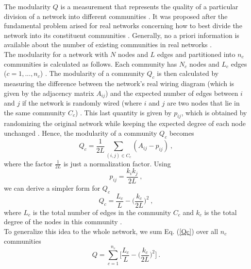\documentclass[11 pt , letterpaper , twoside , openright]{book}
\begin{document}
The modularity $Q$ is a measurement that represents the quality of a particular division of a network into different communities \cite{F.Costa2007}. It was proposed after the fundamental problem arised for real networks concerning how to best divide the network into its constituent communities \cite{F.Costa2007}. Generally, no a priori information is available about the number of existing communities in real networks \cite{F.Costa2007}.\\
\newline
The modularity for a network with $N$ nodes and $L$ edges and partitioned into $n_c$ communities is calculated as follows. Each community has $N_c$ nodes and $L_c$ edges ($c = 1,..., n_c$) \cite{Albert2016}. The modularity of a community $Q_c$ is then calculated by measuring the difference between the network's real wiring diagram (which is given by the adjacency matrix $A_{ij}$) and the expected number of edges between $i$ and $j$ if the network is randomly wired (where $i$ and $j$ are two nodes that lie in the same community $C_c$) \cite{Albert2016}. This last quantity is given by $p_{ij}$, which is obtained by randomizing the original network while keeping the expected degree of each node unchanged \cite{Albert2016}. Hence, the modularity of a community $Q_c$ becomes \cite{Albert2016}
\begin{equation}
	Q_c = \frac{1}{2L}\sum_{(i,j) \in C_c} (A_{ij} - p_{ij}) \ ,
\end{equation}
where the factor $\frac{1}{2L}$ is just a normalization factor. Using \cite{Albert2016}
\begin{equation}
	p_{ij} = \frac{k_ik_j}{2L} \ ,
\end{equation}
we can derive a simpler form for $Q_c$ \cite{Albert2016}
\begin{equation}\label{Qc}
	Q_c = \frac{L_c}{L} - \bigg(\frac{k_c}{2L}\bigg)^2 \ ,
\end{equation}
where $L_c$ is the total number of edges in the community $C_c$ and $k_c$ is the total degree of the nodes in this community \cite{Albert2016}.\\
\newline
To generalize this idea to the whole network, we sum Eq. (\ref{Qc}) over all $n_c$ communities \cite{Albert2016}
\begin{equation}\label{mod}
	Q = \sum_{c = 1}^{n_c}\bigg[\frac{L_c}{L} - \bigg(\frac{k_c}{2L}\bigg)^2 \bigg] \ .
\end{equation}
\end{document}
